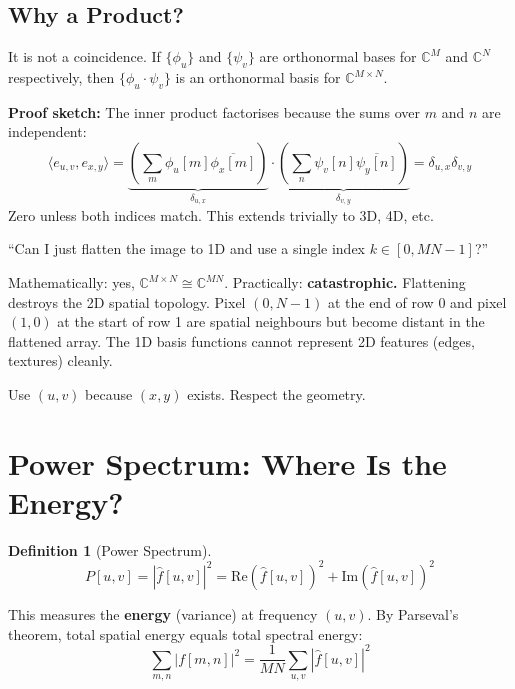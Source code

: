 \documentclass[11pt,a4paper]{article}
\theoremstyle{definition}
\newtheorem{definition}{Definition}[section]
\begin{document}
\subsection{Why a Product?}

It is not a coincidence. If $\{\phi_u\}$ and $\{\psi_v\}$ are orthonormal bases for $\mathbb{C}^M$ and $\mathbb{C}^N$ respectively, then $\{\phi_u \cdot \psi_v\}$ is an orthonormal basis for $\mathbb{C}^{M \times N}$.

\textbf{Proof sketch:} The inner product factorises because the sums over $m$ and $n$ are independent:
\begin{equation}
    \langle e_{u,v}, e_{x,y} \rangle = \underbrace{\left(\sum_m \phi_u[m] \overline{\phi_x[m]}\right)}_{\delta_{u,x}} \cdot \underbrace{\left(\sum_n \psi_v[n] \overline{\psi_y[n]}\right)}_{\delta_{v,y}} = \delta_{u,x}\delta_{v,y}
\end{equation}
Zero unless both indices match. This extends trivially to 3D, 4D, etc.

\begin{pitfall}
``Can I just flatten the image to 1D and use a single index $k \in [0, MN-1]$?''

Mathematically: yes, $\mathbb{C}^{M \times N} \cong \mathbb{C}^{MN}$. Practically: \textbf{catastrophic.} Flattening destroys the 2D spatial topology. Pixel $(0, N-1)$ at the end of row 0 and pixel $(1, 0)$ at the start of row 1 are spatial neighbours but become distant in the flattened array. The 1D basis functions cannot represent 2D features (edges, textures) cleanly.

Use $(u, v)$ because $(x, y)$ exists. Respect the geometry.
\end{pitfall}

\section{Power Spectrum: Where Is the Energy?}

\begin{definition}[Power Spectrum]
\begin{equation}
    P[u,v] = |\hat{f}[u,v]|^2 = \mathrm{Re}(\hat{f}[u,v])^2 + \mathrm{Im}(\hat{f}[u,v])^2
\end{equation}
\end{definition}

This measures the \textbf{energy} (variance) at frequency $(u,v)$. By Parseval's theorem, total spatial energy equals total spectral energy:
\begin{equation}
    \sum_{m,n} |f[m,n]|^2 = \frac{1}{MN} \sum_{u,v} |\hat{f}[u,v]|^2
\end{equation}
\end{document}
